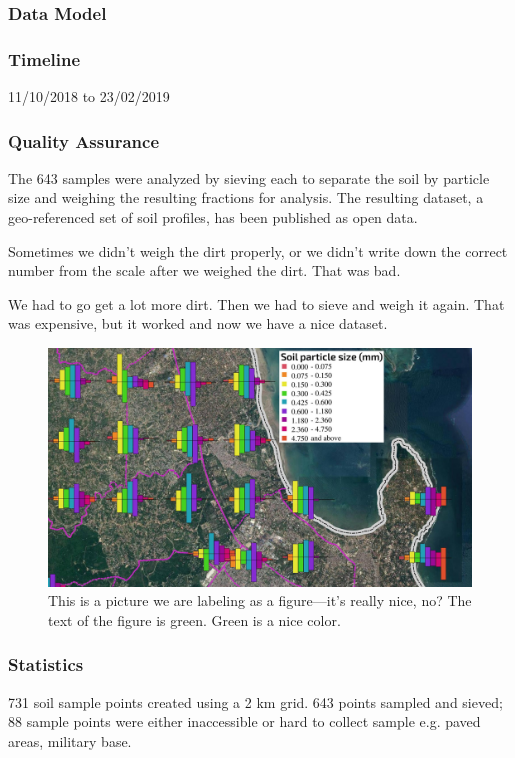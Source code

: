 \documentclass[a4paper,12pt,twoside]{article}
\begin{document}
\subsubsection{Data Model}

\subsubsection{Timeline}
11/10/2018 to 23/02/2019

\subsubsection{Quality Assurance}

The 643 samples were analyzed by sieving each to separate the soil by particle size and weighing the resulting fractions for analysis. The resulting dataset, a geo-referenced set of soil profiles, has been published as open data.

\bigskip

Sometimes we didn't weigh the dirt properly, or we didn't write down the correct number from the scale after we weighed the dirt. That was bad. 

We had to go get a lot more dirt. Then we had to sieve and weigh it again. That was expensive, but it worked and now we have a nice dataset.

\begin{figure}[h]
  \color{RHgreen}\caption{This is a picture we are labeling as a figure---it's really nice, no? The text of the figure is green. Green is a nice color.}
  \centering
  \includegraphics[width=1\textwidth]{soil_map_detail_peninsula_with_legend}
\end{figure}

\subsubsection{Statistics}
731 soil sample points created using a 2 km grid. 643 points sampled and sieved; 88 sample points were either inaccessible or hard to collect sample e.g. paved areas, military base.
\end{document}
